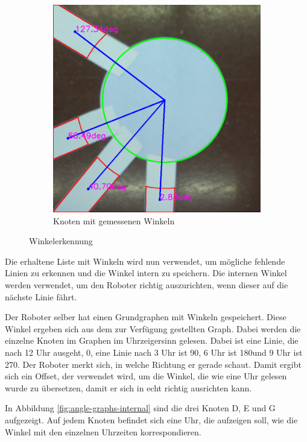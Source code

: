 \begin{figure}[H]
\begin{subfigure}{0.45\textwidth}
\includegraphics[width=0.95\linewidth]{assets/informatik-prototyp/opencv/angle_detection/node_with_edge_angles_annotated.png} 
\caption{Knoten mit gemessenen Winkeln}
\label{fig:node-angles}
\end{subfigure}

\caption{Winkelerkennung}
\label{fig:angle-recognition}
\end{figure}

Die erhaltene Liste mit Winkeln wird nun verwendet, um mögliche fehlende Linien zu erkennen und die Winkel intern zu speichern. Die internen Winkel werden verwendet, um den Roboter richtig auszurichten, wenn dieser auf die nächste Linie fährt.

Der Roboter selber hat einen Grundgraphen mit Winkeln gespeichert. Diese Winkel ergeben sich aus dem zur Verfügung gestellten Graph. Dabei werden die einzelne Knoten im Graphen im Uhrzeigersinn gelesen. Dabei ist eine Linie, die nach 12 Uhr ausgeht, 0\textdegree, eine Linie nach 3 Uhr ist 90\textdegree, 6 Uhr ist 180\textdegree und 9 Uhr ist 270\textdegree. Der Roboter merkt sich, in welche Richtung er gerade schaut. Damit ergibt sich ein Offset, der verwendet wird, um die Winkel, die wie eine Uhr gelesen wurde zu übersetzen, damit er sich in echt richtig ausrichten kann. 

In Abbildung \ref{fig:angle-graphs-internal} sind die drei Knoten D, E und G aufgezeigt. Auf jedem Knoten befindet sich eine Uhr, die aufzeigen soll, wie die Winkel mit den einzelnen Uhrzeiten korrespondieren.


